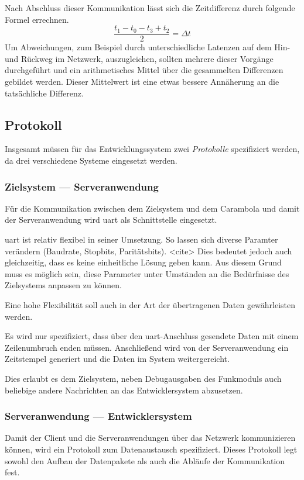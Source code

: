 Nach Abschluss dieser Kommunikation lässt sich die Zeitdifferenz durch folgende
Formel errechnen.
\begin{equation}
\frac{t_1-t_0-t_3+t_2}{2}=\Delta t
\end{equation}
Um Abweichungen, zum Beispiel durch unterschiedliche Latenzen auf dem Hin- und
Rückweg im Netzwerk, auszugleichen, sollten mehrere dieser Vorgänge durchgeführt
und ein arithmetisches Mittel über die gesammelten Differenzen gebildet werden.
Dieser Mittelwert ist eine etwas bessere Annäherung an die tatsächliche
Differenz.

\subsection{Protokoll}
Insgesamt müssen für das Entwicklungssystem zwei \emph{Protokolle} spezifiziert
werden, da drei verschiedene Systeme eingesetzt werden.

\subsubsection*{Zielsystem --- Serveranwendung}
Für die Kommunikation zwischen dem Zielsystem und dem Carambola und damit der
Serveranwendung wird \gls{uart} als Schnittstelle eingesetzt.

\gls{uart} ist relativ flexibel in seiner Umsetzung. So lassen sich
diverse Paramter verändern (Baudrate, Stopbits, Paritätsbits). <cite> Dies
bedeutet jedoch auch gleichzeitig, dass es keine einheitliche Lösung geben kann.
Aus diesem Grund muss es möglich sein, diese Parameter unter Umständen an die
Bedürfnisse des Zielsystems anpassen zu können.

Eine hohe Flexibilität soll auch in der Art der übertragenen Daten
gewährleisten werden.

Es wird nur spezifiziert, dass über den \gls{uart}-Anschluss
gesendete Daten mit einem Zeilenumbruch enden müssen. Anschließend wird von der
Serveranwendung ein Zeitstempel generiert und die Daten im System
weitergereicht.

Dies erlaubt es dem Zielsystem, neben Debugausgaben des Funkmoduls auch
beliebige andere Nachrichten an das Entwicklersystem abzusetzen.

\subsubsection*{Serveranwendung --- Entwicklersystem}
Damit der Client und die Serveranwendungen über das Netzwerk kommunizieren
können, wird ein Protokoll zum Datenaustausch spezifiziert. Dieses Protokoll
legt sowohl den Aufbau der Datenpakete als auch die Abläufe der Kommunikation
fest.

